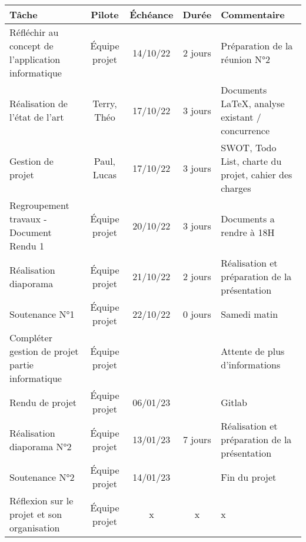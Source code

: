 \documentclass{report}
\begin{document}
\begin{tabular}{|p{4cm}|c|c|c|p{3cm}|}
    \hline
    \textbf{Tâche} & \textbf{Pilote} & \textbf{Échéance} & \textbf{Durée} & \textbf{Commentaire}\\
    \hline
    Réfléchir au concept de l'application informatique & Équipe projet & 14/10/22 & 2 jours & Préparation de la réunion N°2\\
    \hline
    Réalisation de l'état de l'art & Terry, Théo & 17/10/22 & 3 jours & Documents LaTeX, analyse existant / concurrence\\
    \hline
    Gestion de projet & Paul, Lucas & 17/10/22 & 3 jours & SWOT, Todo List, charte du projet, cahier des charges \\
    \hline
    Regroupement travaux - Document Rendu 1 & Équipe projet & 20/10/22 & 3 jours & Documents a rendre à 18H \\
    \hline 
    Réalisation diaporama & Équipe projet & 21/10/22 & 2 jours & Réalisation et préparation de la présentation\\
    \hline
    Soutenance N°1 & Équipe projet & 22/10/22 & 0 jours & Samedi matin\\
    \hline 
    Compléter gestion de projet partie informatique & Équipe projet & & & Attente de plus d'informations\\
    \hline
    Rendu de projet & Équipe projet & 06/01/23 & & Gitlab\\
    \hline
    Réalisation diaporama N°2 & Équipe projet & 13/01/23 & 7 jours & Réalisation et préparation de la présentation\\
    \hline
    Soutenance N°2 & Équipe projet & 14/01/23 & & Fin du projet\\
    \hline
    Réflexion sur le projet et son organisation & Équipe projet & x & x & x\\
    \hline
    
\end{tabular}
\end{document}
